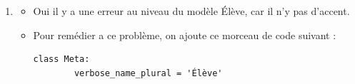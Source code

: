\documentclass[10pt,a4paper]{article}
\begin{document}
\begin{enumerate}
\item
\begin{itemize}
\item Oui il y a une erreur au niveau du modèle Élève, car il n'y pas d'accent.\\
\item Pour remédier a ce problème, on ajoute ce morceau de code suivant : 
\begin{verbatim}
class Meta:
        verbose_name_plural = 'Élève'
\end{verbatim}
\end{itemize}



\end{enumerate}
\end{document}
